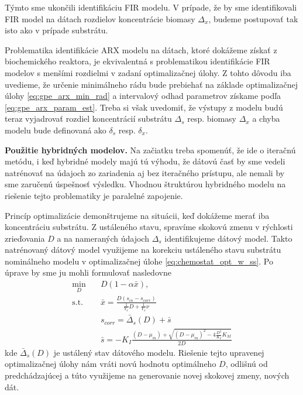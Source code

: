 Týmto sme ukončili identifikáciu FIR modelu. V prípade, že by sme identifikovali FIR model na dátach rozdielov koncentrácie biomasy $ \Delta_{x} $, budeme postupovať tak isto ako v prípade substrátu.

Problematika identifikácie ARX modelu na dátach, ktoré dokážeme získať z biochemického reaktora, je ekvivalentná s problematikou identifikácie FIR modelov s menšími rozdielmi v zadaní optimalizačnej úlohy. Z tohto dôvodu iba uvedieme, že určenie minimálneho rádu bude prebiehať na základe optimalizačnej úlohy \eqref{eq:gpe_arx_min_rad} a intervalový odhad parametrov získame podľa \eqref{eq:gpe_arx_param_est}. Treba si však uvedomiť, že výstupy z modelu budú teraz vyjadrovať rozdiel koncentrácií substrátu $ \Delta_{s} $ resp. biomasy $ \Delta_{x} $ a chyba modelu bude definovaná ako $ \delta_{s} $ resp. $ \delta_{x} $.

\textbf{Použitie hybridných modelov.} Na začiatku treba spomenúť, že ide o iteračnú metódu, i keď hybridné modely majú tú výhodu, že dátovú časť by sme vedeli natrénovať na údajoch zo zariadenia aj bez iteračného prístupu, ale nemali by sme zaručenú úspešnosť výsledku. Vhodnou štruktúrou hybridného modelu na riešenie tejto problematiky je paralelné zapojenie.

Princíp optimalizácie demonštrujeme na situácii, keď dokážeme merať iba koncentráciu substrátu. Z ustáleného stavu, spravíme skokovú zmenu v rýchlosti zrieďovania $ D $ a na nameraných údajoch $ \Delta_{s} $ identifikujeme dátový model. Takto natrénovaný dátový model využijeme na korekciu ustáleného stavu substrátu nominálneho modelu v optimalizačnej úlohe \eqref{eq:chemostat_opt_w_ss}. Po úprave by sme ju mohli formulovať nasledovne
\begin{equation}
\label{eq:hybrid_opt_subs}
	\begin{split}
		\min_{D} &\quad D\left(1-\alpha\bar{x}\right), \\
		\text{s.t.} &\quad \bar{x} = \frac{D\left(s_{in}-s_{corr}\right)}{\frac{1}{Y_{x}}D + \frac{1}{Y_{x}}\nu} \\
		&\quad s_{corr} = \bar{\Delta}_{s}(D) + \bar{s}\\
		&\quad \bar{s} = -K_{I}\frac{\left(D-\mu_{m}\right) + \sqrt{\left(D-\mu_{m}\right)^2 - 4\frac{D^2}{K_{I}}K_{M}}}{2D}
	\end{split}
\end{equation}
kde $ \bar{\Delta}_{s}(D) $ je ustálený stav dátového modelu. Riešenie tejto upravenej optimalizačnej úlohy nám vráti novú hodnotu optimálneho $ D $, odlišnú od predchádzajúcej a túto využijeme na generovanie novej skokovej zmeny, nových dát. 

